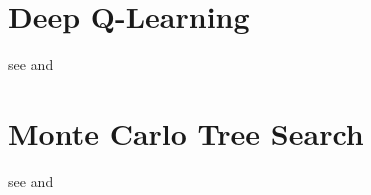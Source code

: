\section{Deep Q-Learning}

see \cite{Watkins1992} and \cite{https://doi.org/10.48550/arxiv.1805.07470}


\section{Monte Carlo Tree Search}

see \cite{https://doi.org/10.48550/arxiv.1805.07470} and \cite{AlphaGo}